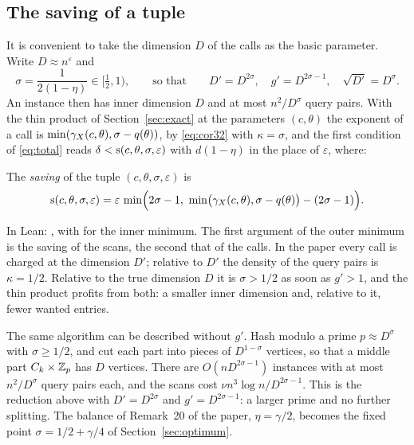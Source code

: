 \subsection{The saving of a tuple}

It is convenient to take the dimension \(D\) of the calls as the basic
parameter.  Write \(D\approx n^{\varepsilon}\) and
\begin{equation}\label{eq:sigma}
  \sigma=\frac{1}{2(1-\eta)}\in\bigl[\tfrac12,1\bigr),\qquad\text{so that}\qquad
  D'=D^{2\sigma},\quad g'=D^{2\sigma-1},\quad\sqrt{D'}=D^{\sigma}.
\end{equation}
An instance then has inner dimension \(D\) and at most \(n^{2}/D^{\sigma}\)
query pairs.  With the thin product of Section~\ref{sec:exact} at the
parameters \((c,\theta)\) the exponent of a call is
\(\min(\gamma_{X}(c,\theta),\sigma-q(\theta))\), by \eqref{eq:cor32} with
\(\kappa=\sigma\), and the first condition of \eqref{eq:total} reads
\(\delta<\operatorname{s}(c,\theta,\sigma,\varepsilon)\) with \(d(1-\eta)\) in the place of
\(\varepsilon\), where:

\begin{definition}\label{def:saving}
The \emph{saving} of the tuple \((c,\theta,\sigma,\varepsilon)\) is
\[
  \sav(c,\theta,\sigma,\varepsilon)
  =\varepsilon\,\min\Bigl(2\sigma-1,\ \min\bigl(\gX(c,\theta),\sigma-q(\theta)\bigr)-(2\sigma-1)\Bigr).
\]
\end{definition}

In Lean: , with  for the inner minimum.  The
first argument of the outer minimum is the saving of the scans, the second
that of the calls.  In the paper every call is charged at the dimension \(D'\); relative to
\(D'\) the density of the query pairs is \(\kappa=1/2\).  Relative to the true
dimension \(D\) it is \(\sigma>1/2\) as soon as \(g'>1\), and the thin product
profits from both: a smaller inner dimension and, relative to it, fewer wanted
entries.

\begin{remark}\label{rem:prime}
The same algorithm can be described without \(g'\).  Hash modulo a prime
\(p\approx D^{\sigma}\) with \(\sigma\ge1/2\), and cut each part into pieces of
\(D^{1-\sigma}\) vertices, so that a middle part \(C_k\times\mathbb{Z}_p\) has \(D\)
vertices.  There are \(O(nD^{2\sigma-1})\) instances with at most
\(n^{2}/D^{\sigma}\) query pairs each, and the scans cost
\(\nu n^{3}\log n/D^{2\sigma-1}\).  This is the reduction above with
\(D'=D^{2\sigma}\) and \(g'=D^{2\sigma-1}\): a larger prime and no further
splitting.  The balance of Remark~20 of the paper, \(\eta=\gamma/2\), becomes
the fixed point \(\sigma=1/2+\gamma/4\) of Section~\ref{sec:optimum}.
\end{remark}
